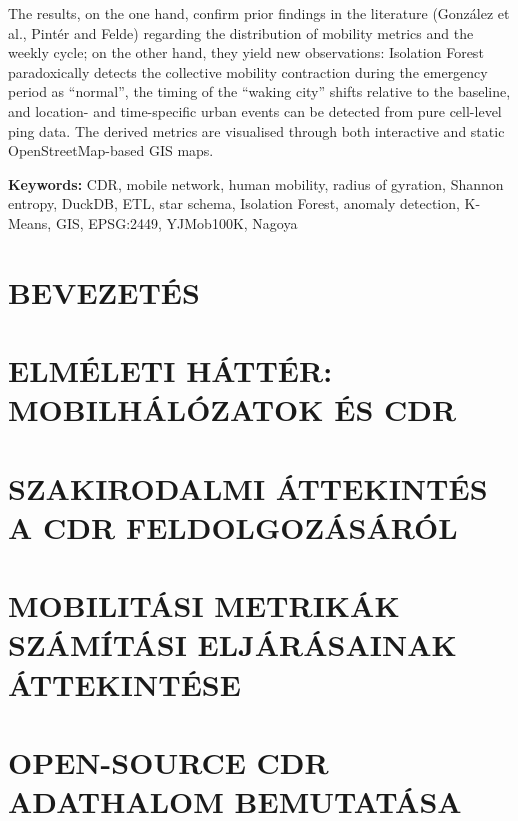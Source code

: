 The results, on the one hand, confirm prior findings in the literature (González et al., Pintér and Felde) regarding the distribution of mobility metrics and the weekly cycle; on the other hand, they yield new observations: Isolation Forest paradoxically detects the collective mobility contraction during the emergency period as ``normal'', the timing of the ``waking city'' shifts relative to the baseline, and location- and time-specific urban events can be detected from pure cell-level ping data. The derived metrics are visualised through both interactive and static OpenStreetMap-based GIS maps.

\vspace{0.5em}
\noindent\textbf{Keywords:} CDR, mobile network, human mobility, radius of gyration, Shannon entropy, DuckDB, ETL, star schema, Isolation Forest, anomaly detection, K-Means, GIS, EPSG:2449, YJMob100K, Nagoya



\newpage
{}
\tableofcontents
\newpage




\clearpage
\section{BEVEZETÉS}


\clearpage
\section{ELMÉLETI HÁTTÉR: MOBILHÁLÓZATOK ÉS CDR}



\clearpage
\section{SZAKIRODALMI ÁTTEKINTÉS A CDR FELDOLGOZÁSÁRÓL}


\clearpage
\section{MOBILITÁSI METRIKÁK SZÁMÍTÁSI ELJÁRÁSAINAK ÁTTEKINTÉSE}


\clearpage
\section{OPEN-SOURCE CDR ADATHALOM BEMUTATÁSA}


